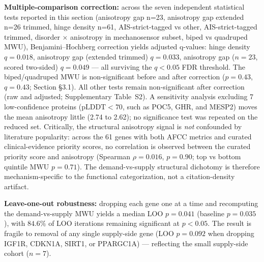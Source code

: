 \textbf{Multiple-comparison correction:} across the seven independent statistical tests reported in this section (anisotropy gap n=23, anisotropy gap extended n=26 trimmed, hinge density n=61, AIS-strict-tagged vs other, AIS-strict-tagged trimmed, disorder $\times$ anisotropy in mechanosensor subset, biped vs quadruped MWU), Benjamini--Hochberg correction yields adjusted q-values: hinge density $q = 0.018$, anisotropy gap (extended trimmed) $q = 0.033$, anisotropy gap ($n=23$, scored two-sided) $q = 0.049$ --- all surviving the $q < 0.05$ FDR threshold. The biped/quadruped MWU is non-significant before and after correction ($p = 0.43$, $q = 0.43$; Section §3.1). All other tests remain non-significant after correction (raw and adjusted; Supplementary Table~S2). A sensitivity analysis excluding 7 low-confidence proteins ($\text{pLDDT} < 70$, such as POC5, GHR, and MESP2) moves the mean anisotropy little (2.74 to 2.62); no significance test was repeated on the reduced set. Critically, the structural anisotropy signal is \emph{not} confounded by literature popularity: across the 61 genes with both AFCC metrics and curated clinical-evidence priority scores, no correlation is observed between the curated priority score and anisotropy (Spearman $\rho = 0.016$, $p = 0.90$; top vs bottom quintile MWU $p = 0.71$). The demand-vs-supply structural dichotomy is therefore mechanism-specific to the functional categorization, not a citation-density artifact.

\textbf{Leave-one-out robustness:} dropping each gene one at a time and recomputing the demand-vs-supply MWU yields a median LOO $p = 0.041$ (baseline $p = 0.035$), with $84.6\%$ of LOO iterations remaining significant at $p < 0.05$. The result is fragile to removal of any single supply-side gene (LOO $p = 0.092$ when dropping IGF1R, CDKN1A, SIRT1, or PPARGC1A) --- reflecting the small supply-side cohort ($n = 7$).

